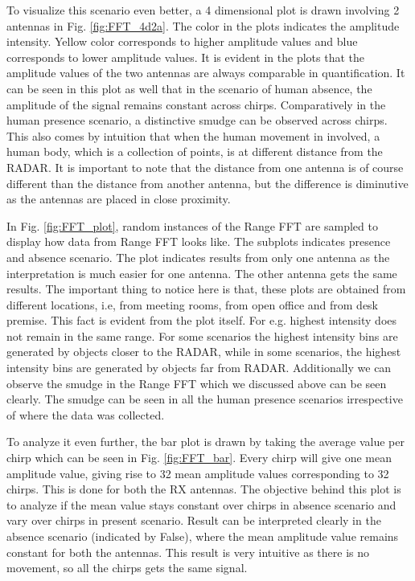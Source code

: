 To visualize this scenario even better, a 4 dimensional plot is drawn involving 2 antennas in Fig. \ref{fig:FFT_4d2a}. The color in the plots indicates the amplitude intensity. Yellow color corresponds to higher amplitude values and blue corresponds to lower amplitude values. It is evident in the plots that the amplitude values of the two antennas are always comparable in quantification. It can be seen in this plot as well that in the scenario of human absence, the amplitude of the signal remains constant across chirps. Comparatively in the human presence scenario, a distinctive smudge can be observed across chirps. This also comes by intuition that when the human movement in involved, a human body, which is a collection of points, is at different distance from the RADAR. It is important to note that the distance from one antenna is of course different than the distance from another antenna, but the difference is diminutive as the antennas are placed in close proximity.

In Fig. \ref{fig:FFT_plot}, random instances of the Range FFT are sampled to display how data from Range FFT looks like. The subplots indicates presence and absence scenario. The plot indicates results from only one antenna as the interpretation is much easier for one antenna. The other antenna gets the same results. The important thing to notice here is that, these plots are obtained from different locations, i.e, from meeting rooms, from open office and from desk premise. This fact is evident from the plot itself. For e.g. highest intensity does not remain in the same range. For some scenarios the highest intensity bins are generated by objects closer to the RADAR, while in some scenarios, the highest intensity bins are generated by objects far from RADAR. Additionally we can observe the smudge in the Range FFT which we discussed above can be seen clearly. The smudge can be seen in all the human presence scenarios irrespective of where the data was collected. 

To analyze it even further, the bar plot is drawn by taking the average value per chirp which can be seen in Fig. \ref{fig:FFT_bar}. Every chirp will give one mean amplitude value, giving rise to 32 mean amplitude values corresponding to 32 chirps. This is done for both the RX antennas. The objective behind this plot is to analyze if the mean value stays constant over chirps in absence scenario and vary over chirps in present scenario. Result can be interpreted clearly in the absence scenario (indicated by False), where the mean amplitude value remains constant for both the antennas. This result is very intuitive as there is no movement, so all the chirps gets the same signal.

